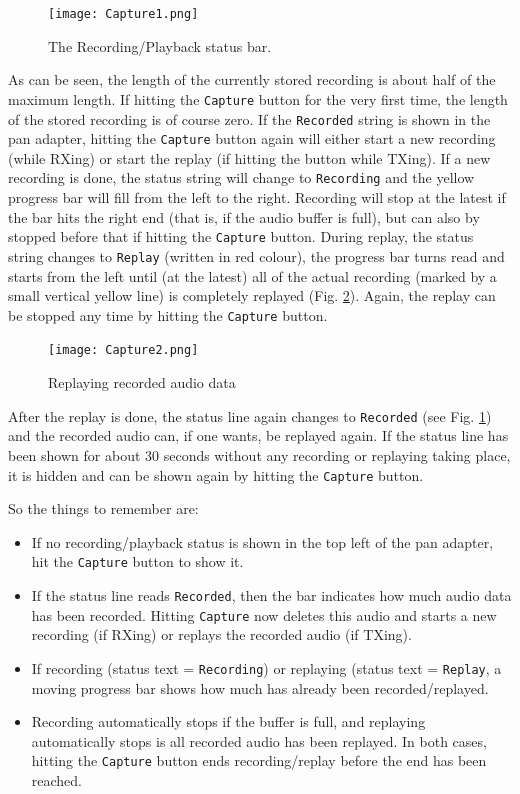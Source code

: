 \documentclass[12pt]{book}
\def\rett#1{\texttt{\color{red}#1}}
\def\bltt#1{\texttt{\color{blue}#1}}
\begin{document}
\begin{figure}[ht]
\center
\texttt{[image: Capture1.png]}
\caption{The Recording/Playback status bar.}
\label{fig:capture1}
\end{figure}

As can be seen, the length of the currently stored recording is about half of the maximum length. If hitting
the \bltt{Capture} button for the very first time, the length of the stored recording is of course zero. If
the \rett{Recorded} string is shown in the pan adapter, hitting the \bltt{Capture} button again will either
start a new recording (while RXing) or start the replay (if hitting the button while TXing).
If a new recording is done, the status string will change to \rett{Recording} and the yellow progress bar
will fill from the left to the right. Recording will stop at the latest if the bar hits the right end
(that is, if the audio buffer is full), but can also by stopped before that if hitting the \bltt{Capture}
button. During replay, the status string changes to \rett{Replay} (written in red colour), the progress bar
turns read and starts from the left until (at the latest) all of the actual recording (marked by a small
vertical yellow line) is completely replayed (Fig. \ref{fig:capture2}). Again, the replay can be stopped any time by hitting
the \bltt{Capture} button.

\begin{figure}[ht]
\center
\texttt{[image: Capture2.png]}
\caption{Replaying recorded audio data}
\label{fig:capture2}
\end{figure}

After the replay is done, the status line again changes to \rett{Recorded} (see Fig. \ref{fig:capture1})
and the recorded audio can, if one wants, be replayed again. If the status line has been shown for about
30 seconds without any recording or replaying taking place, it is hidden and can be shown again by
hitting the \bltt{Capture} button.

So the things to remember are:
\begin{itemize}
\item{If no recording/playback status is shown in the top left of the pan adapter, hit the  \bltt{Capture} button
to show it.}
\item{If the status line reads \rett{Recorded}, then the bar indicates how much audio data has been recorded. Hitting
\bltt{Capture} now deletes this audio and starts a new recording (if RXing) or replays the recorded audio
(if TXing).}
\item{If recording (status text = \rett{Recording}) or replaying (status text = \rett{Replay}, a moving progress
bar shows how much has already been recorded/replayed.}
\item{Recording automatically stops if the buffer is full, and replaying automatically stops is all recorded audio
has been replayed. In both cases, hitting the \bltt{Capture} button ends recording/replay before the end has been reached.}
\end{itemize}
\end{document}
